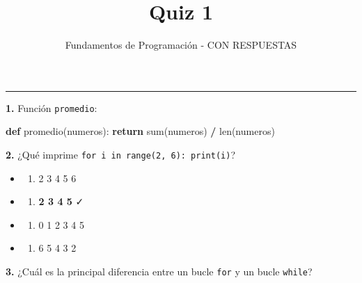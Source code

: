 \documentclass[
  9pt,
]{article}
\title{Quiz 1}
\subtitle{Fundamentos de Programación - CON RESPUESTAS}
\author{}
\date{\vspace{-2.5em}}
\newenvironment{Shaded}{\begin{snugshade}}{\end{snugshade}}
\newcommand{\BuiltInTok}[1]{#1}
\newcommand{\ControlFlowTok}[1]{\textcolor[rgb]{0.13,0.29,0.53}{\textbf{#1}}}
\newcommand{\KeywordTok}[1]{\textcolor[rgb]{0.13,0.29,0.53}{\textbf{#1}}}
\newcommand{\NormalTok}[1]{#1}
\newcommand{\OperatorTok}[1]{\textcolor[rgb]{0.81,0.36,0.00}{\textbf{#1}}}
\providecommand{\tightlist}{%
  \setlength{\itemsep}{0pt}\setlength{\parskip}{0pt}}
\begin{document}
\maketitle

\begin{center}\rule{0.5\linewidth}{0.5pt}\end{center}

\textbf{1.} Función \texttt{promedio}:

\begin{Shaded}
\begin{Highlighting}[]
\KeywordTok{def}\NormalTok{ promedio(numeros):}
    \ControlFlowTok{return} \BuiltInTok{sum}\NormalTok{(numeros) }\OperatorTok{/} \BuiltInTok{len}\NormalTok{(numeros)}
\end{Highlighting}
\end{Shaded}

\textbf{2.} ¿Qué imprime \texttt{for\ i\ in\ range(2,\ 6):\ print(i)}?

\begin{itemize}
\tightlist
\item
  \begin{enumerate}
  \def\labelenumi{\Alph{enumi})}
  \tightlist
  \item
    2 3 4 5 6
  \end{enumerate}
\item
  \begin{enumerate}
  \def\labelenumi{\Alph{enumi})}
  \setcounter{enumi}{1}
  \tightlist
  \item
    \textbf{2 3 4 5} ✓
  \end{enumerate}
\item
  \begin{enumerate}
  \def\labelenumi{\Alph{enumi})}
  \setcounter{enumi}{2}
  \tightlist
  \item
    0 1 2 3 4 5
  \end{enumerate}
\item
  \begin{enumerate}
  \def\labelenumi{\Alph{enumi})}
  \setcounter{enumi}{3}
  \tightlist
  \item
    6 5 4 3 2
  \end{enumerate}
\end{itemize}

\textbf{3.} ¿Cuál es la principal diferencia entre un bucle \texttt{for}
y un bucle \texttt{while}?
\end{document}

